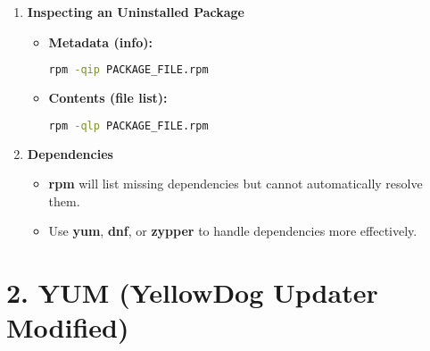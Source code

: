 \documentclass[12pt,a4paper]{report}
\begin{document}
\begin{enumerate}
\item \textbf{Inspecting an Uninstalled Package}
\begin{itemize}
    \item \textbf{Metadata (info):}
    \begin{lstlisting}[language=bash]
rpm -qip PACKAGE_FILE.rpm
    \end{lstlisting}
    \item \textbf{Contents (file list):}
    \begin{lstlisting}[language=bash]
rpm -qlp PACKAGE_FILE.rpm
    \end{lstlisting}
\end{itemize}

\item \textbf{Dependencies}
\begin{itemize}
    \item \textbf{rpm} will list missing dependencies but cannot automatically resolve them.
    \item Use \textbf{yum}, \textbf{dnf}, or \textbf{zypper} to handle dependencies more effectively.
\end{itemize}
\end{enumerate}

\section*{2. YUM (YellowDog Updater Modified)}
\end{document}
